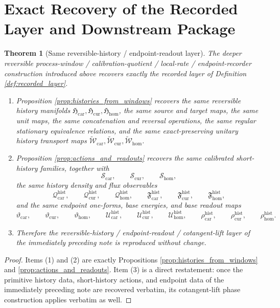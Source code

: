 \documentclass[11pt]{article}
\newcommand{\TensorHistoryClass}{\mathfrak H_{\mathrm{car}}}
\newcommand{\CurHistoryClass}{\mathfrak H_{\mathrm{cur}}}
\newcommand{\HomHistoryClass}{\mathfrak H_{\mathrm{hom}}}
\newcommand{\TensorHistoryAction}{\mathscr S_{\mathrm{car}}}
\newcommand{\CurHistoryAction}{\mathscr S_{\mathrm{cur}}}
\newcommand{\HomHistoryAction}{\mathscr S_{\mathrm{hom}}}
\newcommand{\TensorHistoryRep}{\widetilde{\mathscr W}_{\mathrm{car}}}
\newcommand{\CurHistoryRep}{\widetilde{\mathscr W}_{\mathrm{cur}}}
\newcommand{\HomHistoryRep}{\widetilde{\mathscr W}_{\mathrm{hom}}}
\newtheorem{theorem}{Theorem}
\begin{document}
\section{Exact Recovery of the Recorded Layer and Downstream Package}

\begin{theorem}[Same reversible-history / endpoint-readout layer]
\label{thm:same_layer}
The deeper reversible process-window / calibration-quotient / local-rate / endpoint-recorder construction introduced above recovers exactly the recorded layer of Definition \ref{def:recorded_layer}.
\begin{enumerate}
    \item Proposition \ref{prop:histories_from_windows} recovers the same reversible history manifolds \(\TensorHistoryClass,\CurHistoryClass,\HomHistoryClass\), the same source and target maps, the same unit maps, the same concatenation and reversal operations, the same regular stationary equivalence relations, and the same exact-preserving unitary history transport maps \(\TensorHistoryRep,\CurHistoryRep,\HomHistoryRep\).
    \item Proposition \ref{prop:actions_and_readouts} recovers the same calibrated short-history families, together with
    \[
    \TensorHistoryAction,\qquad
    \CurHistoryAction,\qquad
    \HomHistoryAction,
    \]
    the same history density and flux observables
    \[
    \mathcal Q_{\mathrm{car}}^{\mathrm{hist}},\qquad
    \mathcal Q_{\mathrm{cur}}^{\mathrm{hist}},\qquad
    \mathcal Q_{\mathrm{hom}}^{\mathrm{hist}},\qquad
    \mathfrak F_{\mathrm{car}}^{\mathrm{hist}},\qquad
    \mathfrak F_{\mathrm{cur}}^{\mathrm{hist}},\qquad
    \mathfrak F_{\mathrm{hom}}^{\mathrm{hist}},
    \]
    and the same endpoint one-forms, base energies, and base readout maps
    \[
    \vartheta_{\mathrm{car}},\qquad
    \vartheta_{\mathrm{cur}},\qquad
    \vartheta_{\mathrm{hom}},\qquad
    \mathcal U_{\mathrm{car}}^{\mathrm{hist}},\qquad
    \mathcal U_{\mathrm{cur}}^{\mathrm{hist}},\qquad
    \mathcal U_{\mathrm{hom}}^{\mathrm{hist}},\qquad
    \rho_{\mathrm{car}}^{\mathrm{hist}},\qquad
    \rho_{\mathrm{cur}}^{\mathrm{hist}},\qquad
    \rho_{\mathrm{hom}}^{\mathrm{hist}}.
    \]
    \item Therefore the reversible-history / endpoint-readout / cotangent-lift layer of the immediately preceding note is reproduced without change.
\end{enumerate}
\end{theorem}

\begin{proof}
Items (1) and (2) are exactly Propositions \ref{prop:histories_from_windows} and \ref{prop:actions_and_readouts}. Item (3) is a direct restatement: once the primitive history data, short-history actions, and endpoint data of the immediately preceding note are recovered verbatim, its cotangent-lift phase construction applies verbatim as well.
\end{proof}
\end{document}
